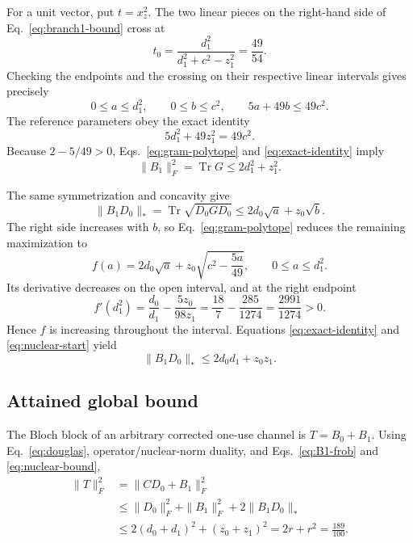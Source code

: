 \documentclass[11pt]{article}
\newcommand{\Tr}{\operatorname{Tr}}
\begin{document}
For a unit vector, put $t=x_z^2$. The two linear pieces on the right-hand side
of Eq.~\eqref{eq:branch1-bound} cross at
\begin{equation}
 t_0=\frac{d_1^2}{d_1^2+c^2-z_1^2}=\frac{49}{54}.
 \label{eq:crossing}
\end{equation}
Checking the endpoints and the crossing on their respective linear intervals
gives precisely
\begin{equation}
 0\le a\le d_1^2,\qquad 0\le b\le c^2,
 \qquad 5a+49b\le49c^2.
 \label{eq:gram-polytope}
\end{equation}
The reference parameters obey the exact identity
\begin{equation}
 5d_1^2+49z_1^2=49c^2.
 \label{eq:exact-identity}
\end{equation}
Because $2-5/49>0$, Eqs.~\eqref{eq:gram-polytope} and
\eqref{eq:exact-identity} imply
\begin{equation}
 \|B_1\|_F^2=\Tr G\le2d_1^2+z_1^2.
 \label{eq:B1-frob}
\end{equation}

The same symmetrization and concavity give
\begin{equation}
 \|B_1D_0\|_*=\Tr\sqrt{D_0GD_0}
 \le2d_0\sqrt a+z_0\sqrt b.
 \label{eq:nuclear-start}
\end{equation}
The right side increases with $b$, so Eq.~\eqref{eq:gram-polytope} reduces the
remaining maximization to
\begin{equation}
 f(a)=2d_0\sqrt a+z_0\sqrt{c^2-\frac{5a}{49}},
 \qquad 0\le a\le d_1^2.
 \label{eq:f-function}
\end{equation}
Its derivative decreases on the open interval, and at the right endpoint
\begin{equation}
 f'(d_1^2)=\frac{d_0}{d_1}-\frac{5z_0}{98z_1}
 =\frac{18}{7}-\frac{285}{1274}
 =\frac{2991}{1274}>0.
 \label{eq:endpoint-derivative}
\end{equation}
Hence $f$ is increasing throughout the interval. Equations
\eqref{eq:exact-identity} and \eqref{eq:nuclear-start} yield
\begin{equation}
 \|B_1D_0\|_*\le2d_0d_1+z_0z_1.
 \label{eq:nuclear-bound}
\end{equation}

\subsection{Attained global bound}

The Bloch block of an arbitrary corrected one-use channel is $T=B_0+B_1$.
Using Eq.~\eqref{eq:douglas}, operator/nuclear-norm duality, and
Eqs.~\eqref{eq:B1-frob} and \eqref{eq:nuclear-bound},
\begin{align}
 \|T\|_F^2
 &=\|CD_0+B_1\|_F^2\nonumber\\
 &\le \|D_0\|_F^2+\|B_1\|_F^2+2\|B_1D_0\|_*\nonumber\\
 &\le2(d_0+d_1)^2+(z_0+z_1)^2
 =2r+r^2=\frac{189}{100}.
 \label{eq:sharp-one-clock}
\end{align}
\end{document}
